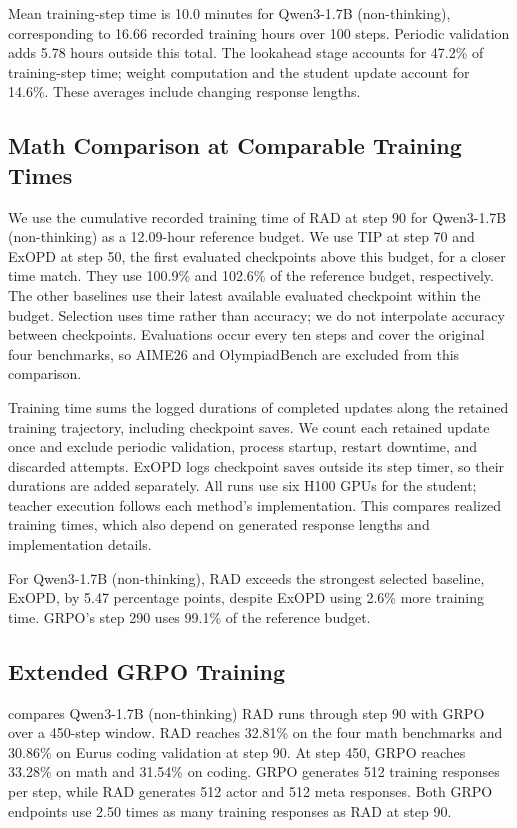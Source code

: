 \documentclass{article} %
\begin{document}
Mean training-step time is 10.0 minutes for Qwen3-1.7B (non-thinking),
corresponding to 16.66 recorded training hours over 100 steps.
Periodic validation adds 5.78 hours outside this total. The lookahead
stage accounts for 47.2\% of training-step time; weight
computation and the student update account for 14.6\%.
These averages include changing response lengths.

\subsection{Math Comparison at Comparable Training Times}
\label{app:math-training-time}

We use the cumulative recorded training time of RAD at step 90 for
Qwen3-1.7B (non-thinking) as a 12.09-hour reference budget.
We use TIP at step 70 and ExOPD at step 50, the first evaluated checkpoints
above this budget, for a closer time match. They use 100.9\% and 102.6\%
of the reference budget, respectively. The other baselines use their latest
available evaluated checkpoint within the budget.
Selection uses time rather than accuracy; we do not interpolate
accuracy between checkpoints. Evaluations occur every ten steps and cover
the original four benchmarks, so AIME26 and OlympiadBench are excluded from this comparison.

Training time sums the logged durations of completed updates along the
retained training trajectory, including checkpoint saves. We count each
retained update once and exclude periodic validation, process startup,
restart downtime, and discarded attempts. ExOPD logs checkpoint saves
outside its step timer, so their durations are added separately. All runs
use six H100 GPUs for the student; teacher execution follows each method's
implementation. This compares realized training times, which also depend
on generated response lengths and implementation details.



For Qwen3-1.7B (non-thinking), RAD exceeds the strongest selected baseline,
ExOPD, by 5.47 percentage points, despite ExOPD using 2.6\% more training
time. GRPO's step 290 uses 99.1\% of the reference budget.

\subsection{Extended GRPO Training}
\label{app:extended-grpo}

 compares Qwen3-1.7B (non-thinking) RAD runs
through step 90 with GRPO over a 450-step window. RAD reaches 32.81\%
on the four math benchmarks and 30.86\% on Eurus coding validation at
step 90. At step 450, GRPO reaches
33.28\% on math and 31.54\% on coding.
GRPO generates 512 training responses per step, while RAD generates
512 actor and 512 meta responses. Both GRPO endpoints use 2.50
times as many training responses as RAD at step 90.
\end{document}
